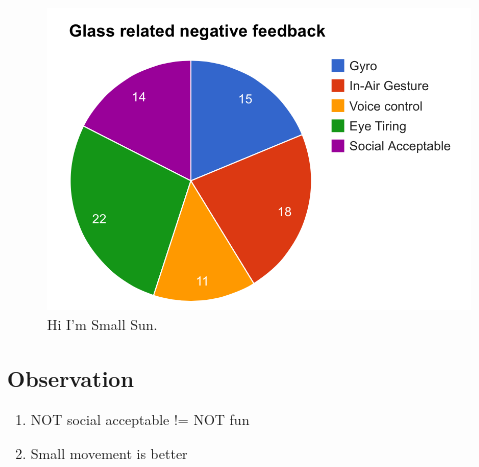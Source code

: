 
\begin{figure}[!t]
\centering
\includegraphics[width=0.9\columnwidth]{Figures/US1_userfeedbackStatistics.png}
\caption{Hi I'm Small Sun.}
\label{fig:PS_Frus}
\end{figure}


\subsection{Observation}

\begin{enumerate}
\item NOT social acceptable != NOT fun
\item Small movement is better
\end{enumerate}


